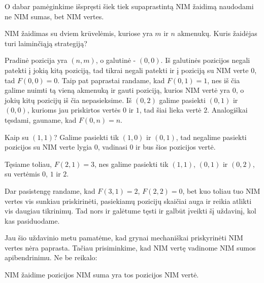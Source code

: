 O dabar pamėginkime išspręsti šiek tiek supaprastintą NIM žaidimą naudodami
ne NIM sumas, bet NIM vertes.

\begin{pavnr}
  NIM žaidimas su dviem krūvelėmis, kuriose yra $m$ ir $n$ akmenukų. Kuris
  žaidėjas turi laiminčiąją strategiją?
\end{pavnr}

\begin{sprendimas}
Pradinė pozicija yra $(n,m)$, o galutinė - $(0,0)$. Iš galutinės pozicijos
negali patekti į jokią kitą poziciją, tad tikrai negali patekti ir į
poziciją su NIM verte $0$, tad $F(0,0)=0$. Taip pat paprastai randame, kad
$F(0,1)=1$, nes iš čia galime nuimti tą vieną akmenuką ir gauti poziciją,
kurios NIM vertė yra $0$, o jokių kitų pozicijų iš čia nepasieksime.  Iš
$(0,2)$ galime pasiekti $(0,1)$ ir $(0,0)$, kurioms jau priskirtos vertės
$0$ ir $1$, tad šiai  lieka vertė $2$. Analogiškai tęsdami, gauname, kad
$F(0,n)=n$. 

Kaip su $(1,1)$? Galime pasiekti tik $(1,0)$ ir $(0,1)$, tad negalime
pasiekti pozicijos su NIM verte lygia $0$, vadinasi $0$ ir bus šios
pozicijos vertė. 

Tęsiame toliau, $F(2,1)=3$, nes galime pasiekti tik $(1,1)$, $(0,1)$ ir
$(0,2)$, su vertėmis $0$, $1$ ir $2$.

Dar pasistengę randame, kad $F(3,1) = 2$, $F(2,2) = 0$, bet kuo toliau tuo
NIM vertes vis sunkiau priskirinėti, pasiekiamų pozicijų skaičiai auga ir
reikia atlikti vis daugiau tikrinimų. Tad nors ir galėtume tęsti ir galbūt
įveikti šį uždavinį, kol kas pasiduodame.
\end{sprendimas}

Jau šio uždavinio metu pamatėme, kad grynai mechaniškai priskyrinėti NIM
vertes nėra paprasta. Tačiau prisiminkime, kad NIM vertę vadinome NIM sumos
apibendrinimu. Ne be reikalo:

\begin{thm}
  NIM žaidime pozicijos NIM suma yra tos pozicijos NIM vertė. 
\end{thm}

